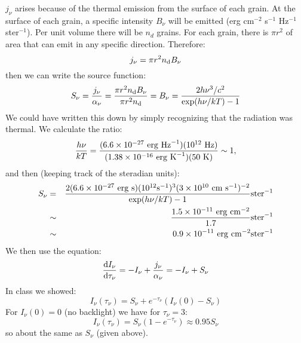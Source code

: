 \documentclass[11pt, preprint]{article}
\begin{document}
\begin{enumerate}
  \begin{answer}
    $j_\nu$ arises because of the thermal emission from the surface of
    each grain. At the surface of each grain, a specific intensity
    $B_\nu$ will be emitted (erg cm$^{-2}$ s$^{-1}$ Hz$^{-1}$
    ster$^{-1}$). Per unit volume there will be $n_d$ grains. For each
    grain, there is $\pi r^2$ of area that can emit in any specific
    direction.
    Therefore:
    \begin{equation}
      j_\nu = \pi r^2 n_{\rm d} B_\nu
    \end{equation}
    then we can write the source function:
    \begin{equation}
      S_\nu = \frac{j_\nu}{\alpha_\nu} = \frac{\pi r^2 n_{\rm d}
        B_\nu}{\pi r^2 n_{\rm d}} = B_\nu = 
      \frac{2 h \nu^3 /c^2}{\exp(h\nu/kT) - 1}
    \end{equation}
    We could have written this down by simply recognizing that the
    radiation was thermal.
    We calculate the ratio:
    \begin{equation}
      \frac{h\nu}{kT} = \frac{(6.6\times 10^{-27} {\rm ~erg~Hz}^{-1})
        (10^{12} {\rm ~Hz})}{(1.38 \times 10^{-16} {\rm
          ~erg~K}^{-1})(50 {\rm ~K})} \sim 1,
    \end{equation}
    and then (keeping track of the steradian units):
    \begin{eqnarray}
      S_\nu &=& \frac{2 (6.6\times 10^{-27} {\rm ~erg~s})
        (10^{12} {\rm s}^{-1})^3 (3\times 10^{10} {\rm
          ~cm~s}^{-1})^{-2}}{\exp(h\nu / kT) - 1} {\rm ster}^{-1}\cr
      &\sim& 
      \frac{1.5 \times 10^{-11} {\rm ~erg} {\rm ~cm}^{-2}}{1.7} {\rm ster}^{-1} \cr
      &\sim& 0.9 \times 10^{-11} {\rm ~erg} {\rm ~cm}^{-2} {\rm ster}^{-1}
    \end{eqnarray}
    We then use the equation:
    \begin{equation}
      \frac{{\rm d}I_\nu}{{\rm d}\tau_\nu} = - I_\nu +
      \frac{j_\nu}{\alpha_\nu} = - I_\nu + S_\nu
    \end{equation}
    In class we showed:
    \begin{equation}
      I_\nu(\tau_\nu) = S_\nu + e^{-\tau_\nu} \left(I_\nu(0) -
      S_\nu\right)
    \end{equation}
    For $I_\nu(0)=0$ (no backlight) we have for $\tau_\nu=3$:
    \begin{equation}
      I_\nu(\tau_\nu) = S_\nu(1-e^{-\tau_\nu}) \approx 0.95 S_\nu 
    \end{equation}
    so about the same as $S_\nu$ (given above).
  \end{answer}
  

\end{enumerate}
\end{document}
